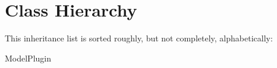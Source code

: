 \section{Class Hierarchy}
This inheritance list is sorted roughly, but not completely, alphabetically\+:\begin{DoxyCompactList}
\item {}
\item Model\+Plugin\begin{DoxyCompactList}
\item {}
\item {}
\end{DoxyCompactList}
\end{DoxyCompactList}
